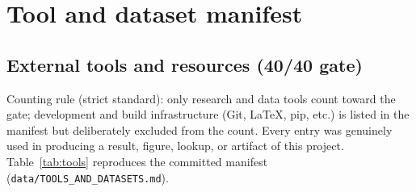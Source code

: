 
\section{Tool and dataset manifest}
\label{app:manifest}

\subsection{External tools and resources (40/40 gate)}

Counting rule (strict standard): only research and data tools count toward
the gate; development and build infrastructure (Git, LaTeX, pip, etc.) is
listed in the manifest but deliberately excluded from the count. Every entry
was genuinely used in producing a result, figure, lookup, or artifact of this
project.
Table~\ref{tab:tools} reproduces the committed manifest
(\texttt{data/TOOLS\_AND\_DATASETS.md}).

